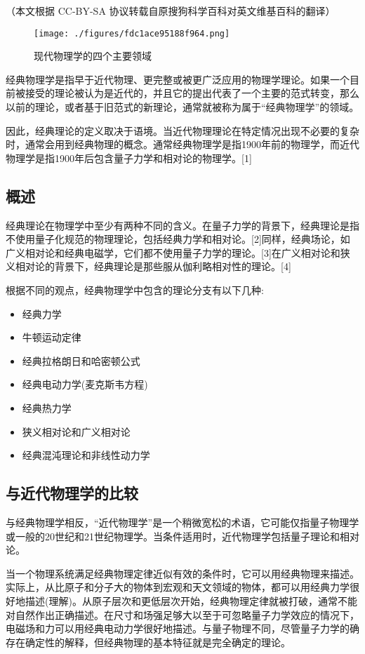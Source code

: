 
（本文根据 CC-BY-SA 协议转载自原搜狗科学百科对英文维基百科的翻译）

\begin{figure}[ht]
\centering
\texttt{[image: ./figures/fdc1ace95188f964.png]}
\caption{现代物理学的四个主要领域} \label{fig_JDWLX_2}
\end{figure}

经典物理学是指早于近代物理、更完整或被更广泛应用的物理学理论。如果一个目前被接受的理论被认为是近代的，并且它的提出代表了一个主要的范式转变，那么以前的理论，或者基于旧范式的新理论，通常就被称为属于“经典物理学”的领域。

因此，经典理论的定义取决于语境。当近代物理理论在特定情况出现不必要的复杂时，通常会用到经典物理的概念。通常经典物理学是指1900年前的物理学，而近代物理学是指1900年后包含量子力学和相对论的物理学。[1]
\subsection{概述}
经典理论在物理学中至少有两种不同的含义。在量子力学的背景下，经典理论是指不使用量子化规范的物理理论，包括经典力学和相对论。[2]同样，经典场论，如广义相对论和经典电磁学，它们都不使用量子力学的理论。[3]在广义相对论和狭义相对论的背景下，经典理论是那些服从伽利略相对性的理论。[4]

根据不同的观点，经典物理学中包含的理论分支有以下几种:
\begin{itemize}
\item 经典力学
\item 牛顿运动定律
\item 经典拉格朗日和哈密顿公式
\item 经典电动力学(麦克斯韦方程)
\item 经典热力学
\item 狭义相对论和广义相对论
\item 经典混沌理论和非线性动力学
\end{itemize}
\subsection{与近代物理学的比较}
与经典物理学相反，“近代物理学”是一个稍微宽松的术语，它可能仅指量子物理学或一般的20世纪和21世纪物理学。当条件适用时，近代物理学包括量子理论和相对论。

当一个物理系统满足经典物理定律近似有效的条件时，它可以用经典物理来描述。实际上，从比原子和分子大的物体到宏观和天文领域的物体，都可以用经典力学很好地描述(理解)。从原子层次和更低层次开始，经典物理定律就被打破，通常不能对自然作出正确描述。在尺寸和场强足够大以至于可忽略量子力学效应的情况下，电磁场和力可以用经典电动力学很好地描述。与量子物理不同，尽管量子力学的确存在确定性的解释，但经典物理的基本特征就是完全确定的理论。

